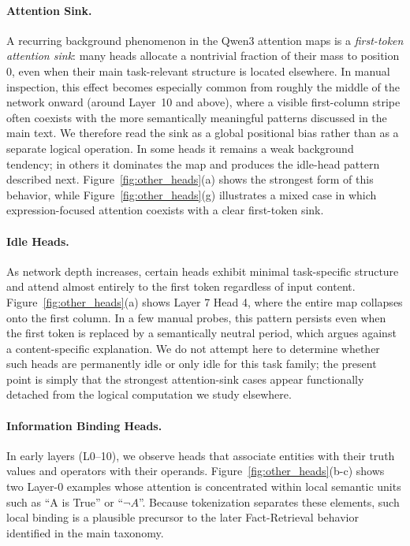 \documentclass[11pt]{article}
\begin{document}
\paragraph{Attention Sink.}
A recurring background phenomenon in the Qwen3 attention maps is a \textit{first-token attention sink}: many heads allocate a nontrivial fraction of their mass to position $0$, even when their main task-relevant structure is located elsewhere. In manual inspection, this effect becomes especially common from roughly the middle of the network onward (around Layer~10 and above), where a visible first-column stripe often coexists with the more semantically meaningful patterns discussed in the main text. We therefore read the sink as a global positional bias rather than as a separate logical operation. In some heads it remains a weak background tendency; in others it dominates the map and produces the idle-head pattern described next. Figure~\ref{fig:other_heads}(a) shows the strongest form of this behavior, while Figure~\ref{fig:other_heads}(g) illustrates a mixed case in which expression-focused attention coexists with a clear first-token sink.

\paragraph{Idle Heads.}
As network depth increases, certain heads exhibit minimal task-specific structure and attend almost entirely to the first token regardless of input content. Figure~\ref{fig:other_heads}(a) shows Layer 7 Head 4, where the entire map collapses onto the first column. In a few manual probes, this pattern persists even when the first token is replaced by a semantically neutral period, which argues against a content-specific explanation. We do not attempt here to determine whether such heads are permanently idle or only idle for this task family; the present point is simply that the strongest attention-sink cases appear functionally detached from the logical computation we study elsewhere.

\paragraph{Information Binding Heads.}
In early layers (L0--10), we observe heads that associate entities with their truth values and operators with their operands. Figure~\ref{fig:other_heads}(b-c) shows two Layer-0 examples whose attention is concentrated within local semantic units such as ``A is True'' or ``$\neg A$''. Because tokenization separates these elements, such local binding is a plausible precursor to the later Fact-Retrieval behavior identified in the main taxonomy.
\end{document}
